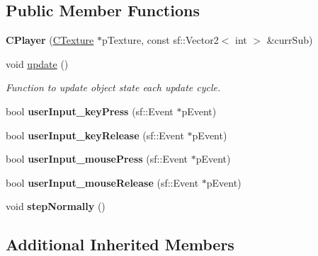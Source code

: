 \subsection*{Public Member Functions}
\begin{DoxyCompactItemize}
\item 
\hypertarget{classCPlayer_a983c63a3e18585a94f66f0bd23c57cd3}{{\bfseries C\-Player} (\hyperlink{classCTexture}{C\-Texture} $\ast$p\-Texture, const sf\-::\-Vector2$<$ int $>$ \&curr\-Sub)}\label{classCPlayer_a983c63a3e18585a94f66f0bd23c57cd3}

\item 
\hypertarget{classCPlayer_aa77025c046956b109a76d53c12a80fa5}{void \hyperlink{classCPlayer_aa77025c046956b109a76d53c12a80fa5}{update} ()}\label{classCPlayer_aa77025c046956b109a76d53c12a80fa5}

\begin{DoxyCompactList}\small\item\em Function to update object state each update cycle. \end{DoxyCompactList}\item 
\hypertarget{classCPlayer_ab91fc8d3c4e992dd20270d5743d75f06}{bool {\bfseries user\-Input\-\_\-key\-Press} (sf\-::\-Event $\ast$p\-Event)}\label{classCPlayer_ab91fc8d3c4e992dd20270d5743d75f06}

\item 
\hypertarget{classCPlayer_a8ef81a467d70f1e4529f3c905820311b}{bool {\bfseries user\-Input\-\_\-key\-Release} (sf\-::\-Event $\ast$p\-Event)}\label{classCPlayer_a8ef81a467d70f1e4529f3c905820311b}

\item 
\hypertarget{classCPlayer_ab73ca18309b25410b1fdb54a9ee60e67}{bool {\bfseries user\-Input\-\_\-mouse\-Press} (sf\-::\-Event $\ast$p\-Event)}\label{classCPlayer_ab73ca18309b25410b1fdb54a9ee60e67}

\item 
\hypertarget{classCPlayer_a915cf5ad902cddb376eb4c37d362e3b1}{bool {\bfseries user\-Input\-\_\-mouse\-Release} (sf\-::\-Event $\ast$p\-Event)}\label{classCPlayer_a915cf5ad902cddb376eb4c37d362e3b1}

\item 
\hypertarget{classCPlayer_aedadef185076d940923e9402a15cdf90}{void {\bfseries step\-Normally} ()}\label{classCPlayer_aedadef185076d940923e9402a15cdf90}

\end{DoxyCompactItemize}
\subsection*{Additional Inherited Members}


